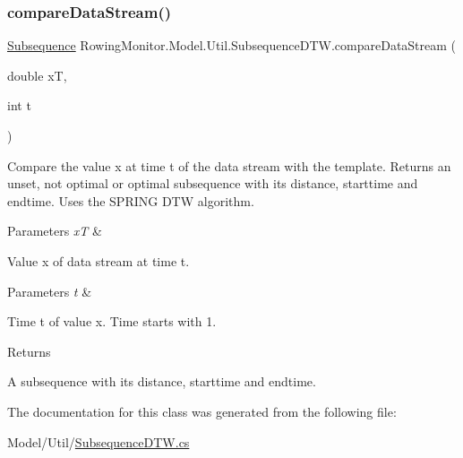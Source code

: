 \subsubsection{\texorpdfstring{compare\+Data\+Stream()}{compareDataStream()}}
{\footnotesize\ttfamily \hyperlink{struct_rowing_monitor_1_1_model_1_1_util_1_1_subsequence}{Subsequence} Rowing\+Monitor.\+Model.\+Util.\+Subsequence\+D\+T\+W.\+compare\+Data\+Stream (\begin{DoxyParamCaption}\item[{double}]{xT,  }\item[{int}]{t }\end{DoxyParamCaption})}



Compare the value x at time t of the data stream with the template. Returns an unset, not optimal or optimal subsequence with its distance, starttime and endtime. Uses the S\+P\+R\+I\+NG D\+TW algorithm. 


\begin{DoxyParams}{Parameters}
{\em xT} & \\
\hline
\end{DoxyParams}
Value x of data stream at time t. 
\begin{DoxyParams}{Parameters}
{\em t} & \\
\hline
\end{DoxyParams}
Time t of value x. Time starts with 1. \begin{DoxyReturn}{Returns}

\end{DoxyReturn}
A subsequence with its distance, starttime and endtime. 

The documentation for this class was generated from the following file\+:\begin{DoxyCompactItemize}
\item 
Model/\+Util/\hyperlink{_subsequence_d_t_w_8cs}{Subsequence\+D\+T\+W.\+cs}\end{DoxyCompactItemize}
